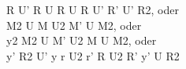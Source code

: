 R U' R U R U R U' R' U' R2, oder\\
M2 U M U2 M' U M2, oder\\
y2 M2 U M' U2 M U M2, oder\\
y' R2 U' y r U2 r' R U2 R' y' U R2\\
